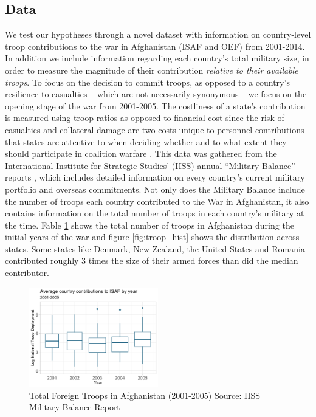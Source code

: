 \documentclass[12pt,letterpaper]{article}
\begin{document}
	\subsection{Data}
		We test our hypotheses through a novel dataset with information on country-level troop contributions to the war in Afghanistan (ISAF and OEF) from 2001-2014. In addition we include information regarding each country's total military size, in order to measure the magnitude of their contribution \textit{relative to their available troops}. To focus on the decision to commit troops, as opposed to a country's resilience to casualties -- which are not necessarily synonymous -- we focus on the opening stage of the war from 2001-2005. The costliness of a state's contribution is measured using troop ratios as opposed to financial cost since the risk of casualties and collateral damage are two costs unique to personnel contributions that states are attentive to when deciding whether and to what extent they should participate in coalition warfare \citep{ringsmose_natoburdensharingredux_2010, chivvis_topplingqaddafilibya_2014, haesebrouck_natoburdensharing_2017}. This data was gathered from the International Institute for Strategic Studies' (IISS) annual ``Military Balance'' reports \citep{internationalinstituteforstrategicstudies_militarybalance_}, which includes detailed information on every country's current military portfolio and overseas commitments. Not only does the Military Balance include the number of troops each country contributed to the War in Afghanistan, it also contains information on the total number of troops in each country's military at the time. Fable \ref{fig:afghan_total} shows the total number of troops in Afghanistan during the initial years of the war and figure \ref{fig:troop_hist} shows the distribution across states. Some states like Denmark, New Zealand, the United States and Romania contributed roughly 3 times the size of their armed forces than did the median contributor.

			\begin{figure}[H]
			\centering
				\includegraphics[width=0.5\textwidth]{country_troop_boxplot.png}
			\caption{Total Foreign Troops in Afghanistan (2001-2005) Source: IISS Military Balance Report}
			\label{fig:afghan_total}
			\end{figure}
\end{document}
